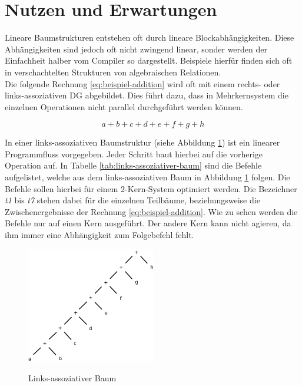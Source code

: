 \section{Nutzen und Erwartungen}
\label{Nutzen}
Lineare Baumstrukturen entstehen oft durch lineare Blockabhängigkeiten. Diese Abhängigkeiten sind jedoch oft nicht zwingend linear, sonder werden der Einfachheit halber vom Compiler so dargestellt. Beispiele hierfür finden sich oft in verschachtelten Strukturen von algebraischen Relationen. \\
Die folgende Rechnung \ref{eq:beispiel-addition} wird oft mit einem rechts- oder links-assoziativen DG abgebildet. Dies führt dazu, dass in Mehrkernsystem die einzelnen Operationen nicht parallel durchgeführt werden können.

\begin{equation} \label{eq:beispiel-addition}
a + b + c + d + e + f + g + h
\end{equation}

In einer links-assoziativen Baumstruktur (siehe Abbildung \ref{fig:links-assoziativer-baum}\cite{HeBIS-309344573}) ist ein linearer Programmfluss vorgegeben. Jeder Schritt baut hierbei auf die vorherige Operation auf. In Tabelle \ref{tab:links-assoziativer-baum}\cite{HeBIS-309344573} sind die Befehle aufgelistet, welche aus dem links-assoziativen Baum in Abbildung \ref{fig:links-assoziativer-baum} folgen. Die Befehle sollen hierbei für einem 2-Kern-System optimiert werden. Die Bezeichner \textit{t1} bis \textit{t7} stehen dabei für die einzelnen Teilbäume, beziehungsweise die Zwischenergebnisse der Rechnung \ref{eq:beispiel-addition}. Wie zu sehen werden die Befehle nur auf einen Kern ausgeführt. Der andere Kern kann nicht agieren, da ihm immer eine Abhängigkeit zum Folgebefehl fehlt.\\

\begin{figure}
	\begin{center}
		\includegraphics[width=0.5\textwidth]{images/links_assoziativer_baum}\\
	\end{center}
	\caption{Links-assoziativer Baum}
	\label{fig:links-assoziativer-baum}
\end{figure}

